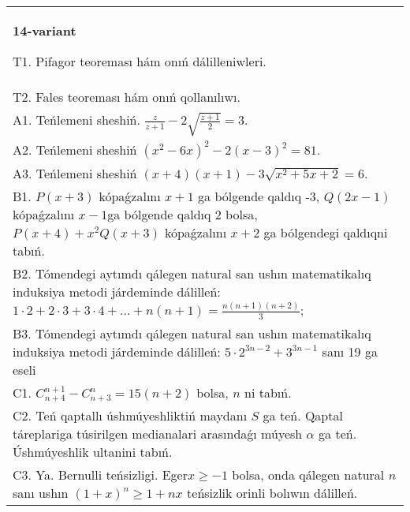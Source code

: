 \documentclass{article}
\begin{document}
\begin{tabular}{m{17cm}}
\textbf{14-variant}
\newline

T1. Pifagor teoreması hám onıń dálilleniwleri. \\
T2. Fales teoreması hám onıń qollanılıwı. \\
A1. Teńlemeni sheshiń. \(\frac{z}{z + 1} - 2\sqrt{\frac{z + 1}{2}} = 3\). \\
A2. Teńlemeni sheshiń \(\left( x^{2} - 6x \right)^{2} - 2(x - 3)^{2} = 81\). \\
A3. Teńlemeni sheshiń \((x + 4)(x + 1) - 3\sqrt{x^{2} + 5x + 2} = 6\). \\
B1. \(P(x + 3)\) kópaǵzalını \(x + 1\) ga bólgende qaldıq -3, \(Q(2x - 1)\) kópaǵzalını \(x - 1\)ga bólgende qaldıq 2 bolsa, \(P(x + 4) + x^{2}Q(x + 3)\) kópaǵzalını \(x + 2\) ga bólgendegi qaldıqni tabıń. \\
B2. Tómendegi aytımdı qálegen natural san ushın matematikalıq induksiya metodi járdeminde dálilleń: \(1 \cdot 2 + 2 \cdot 3 + 3 \cdot 4 + ... + n(n + 1) = \frac{n(n + 1)(n + 2)}{3}\); \\
B3. Tómendegi aytımdı qálegen natural san ushın matematikalıq induksiya metodi járdeminde dálilleń: \(5 \cdot 2^{3n - 2} + 3^{3n - 1}\) sanı 19 ga eseli \\
C1. \(C_{n + 4}^{n + 1} - C_{n + 3}^{n} = 15(n + 2)\) bolsa, \(n\) ni tabıń. \\
C2. Teń qaptallı úshmúyeshliktiń maydanı \(S\) ga teń. Qaptal táreplariga túsirilgen medianalari arasındaǵı múyesh \(\alpha\) ga teń. Úshmúyeshlik ultanini tabıń. \\
C3. Ya. Bernulli teńsizligi. Eger\(x \geq - 1\) bolsa, onda qálegen natural \(n\) sanı ushın \((1 + x)^{n} \geq 1 + nx\) teńsizlik orinli bolıwın dálilleń. \\

\end{tabular}
\vspace{1cm}
\end{document}
